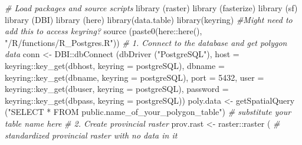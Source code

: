 \documentclass[
]{article}
\newenvironment{Shaded}{\begin{snugshade}}{\end{snugshade}}
\newcommand{\AttributeTok}[1]{\textcolor[rgb]{0.77,0.63,0.00}{#1}}
\newcommand{\CommentTok}[1]{\textcolor[rgb]{0.56,0.35,0.01}{\textit{#1}}}
\newcommand{\FunctionTok}[1]{\textcolor[rgb]{0.00,0.00,0.00}{#1}}
\newcommand{\NormalTok}[1]{#1}
\newcommand{\OtherTok}[1]{\textcolor[rgb]{0.56,0.35,0.01}{#1}}
\newcommand{\SpecialCharTok}[1]{\textcolor[rgb]{0.00,0.00,0.00}{#1}}
\newcommand{\StringTok}[1]{\textcolor[rgb]{0.31,0.60,0.02}{#1}}
\begin{document}
\begin{Shaded}
\begin{Highlighting}[]
\CommentTok{\# Load packages and source scripts}
\FunctionTok{library}\NormalTok{ (raster)}
\FunctionTok{library}\NormalTok{ (fasterize)}
\FunctionTok{library}\NormalTok{ (sf)}
\FunctionTok{library}\NormalTok{ (DBI)}
\FunctionTok{library}\NormalTok{ (here)}
\FunctionTok{library}\NormalTok{(data.table)}
\FunctionTok{library}\NormalTok{(keyring) }\CommentTok{\#Might need to add this to access keyring?}
\FunctionTok{source}\NormalTok{ (}\FunctionTok{paste0}\NormalTok{(here}\SpecialCharTok{::}\FunctionTok{here}\NormalTok{(), }\StringTok{"/R/functions/R\_Postgres.R"}\NormalTok{))}
\CommentTok{\# 1. Connect to the database and get polygon data}
\NormalTok{conn }\OtherTok{\textless{}{-}}\NormalTok{ DBI}\SpecialCharTok{::}\FunctionTok{dbConnect}\NormalTok{ (}\FunctionTok{dbDriver}\NormalTok{ (}\StringTok{"PostgreSQL"}\NormalTok{), }
                        \AttributeTok{host =}\NormalTok{ keyring}\SpecialCharTok{::}\FunctionTok{key\_get}\NormalTok{(}\StringTok{\textquotesingle{}dbhost\textquotesingle{}}\NormalTok{, }\AttributeTok{keyring =} \StringTok{\textquotesingle{}postgreSQL\textquotesingle{}}\NormalTok{), }
                        \AttributeTok{dbname =}\NormalTok{ keyring}\SpecialCharTok{::}\FunctionTok{key\_get}\NormalTok{(}\StringTok{\textquotesingle{}dbname\textquotesingle{}}\NormalTok{, }\AttributeTok{keyring =} \StringTok{\textquotesingle{}postgreSQL\textquotesingle{}}\NormalTok{), }
                        \AttributeTok{port =} \StringTok{\textquotesingle{}5432\textquotesingle{}}\NormalTok{,}
                        \AttributeTok{user =}\NormalTok{ keyring}\SpecialCharTok{::}\FunctionTok{key\_get}\NormalTok{(}\StringTok{\textquotesingle{}dbuser\textquotesingle{}}\NormalTok{, }\AttributeTok{keyring =} \StringTok{\textquotesingle{}postgreSQL\textquotesingle{}}\NormalTok{),}
                        \AttributeTok{password =}\NormalTok{ keyring}\SpecialCharTok{::}\FunctionTok{key\_get}\NormalTok{(}\StringTok{\textquotesingle{}dbpass\textquotesingle{}}\NormalTok{, }\AttributeTok{keyring =} \StringTok{\textquotesingle{}postgreSQL\textquotesingle{}}\NormalTok{))}
\NormalTok{poly.data }\OtherTok{\textless{}{-}} \FunctionTok{getSpatialQuery}\NormalTok{ (}\StringTok{"SELECT * FROM public.name\_of\_your\_polygon\_table"}\NormalTok{) }\CommentTok{\# substitute your table name here}
\CommentTok{\# 2. Create provincial raster }
\NormalTok{prov.rast }\OtherTok{\textless{}{-}}\NormalTok{ raster}\SpecialCharTok{::}\FunctionTok{raster}\NormalTok{ ( }\CommentTok{\# standardized provincial raster with no data in it}

\end{Highlighting}
\end{Shaded}
\end{document}
